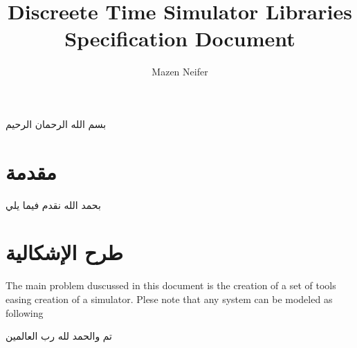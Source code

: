 \documentclass[10pt, A4]{article}
\begin{document}
\title{{\bf D}iscreete {\bf T}ime {\bf S}imulator {\bf L}ibraries\\Specification Document}
\author{Mazen Neifer}
\maketitle
\newpage
{}
\begin{center}
{\huge بسم الله الرحمان الرحيم}
\end{center}
\section{مقدمة}
بحمد الله نقدم فيما يلي
\section{طرح الإشكالية}
\begin{otherlanguage}{english}
\par The main problem duscussed in this document is the creation of a set of tools easing creation of a simulator. Plese note that any system can be modeled as following
\begin{figure}
\end{figure}
\end{otherlanguage}
\par
تم والحمد لله رب العالمين
\end{document}
